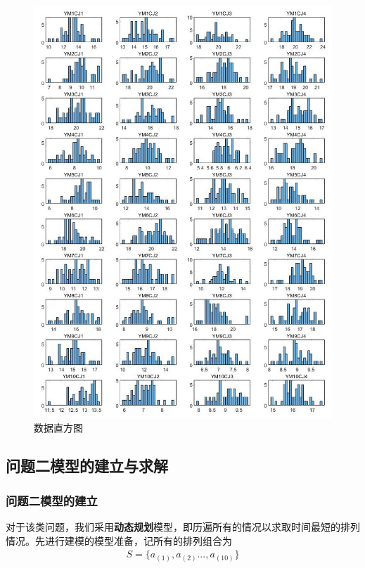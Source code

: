 \documentclass{ctexart}
\begin{document}
\begin{figure}
\centerline{\includegraphics[width=1\linewidth]{A1图片/数据分布直方图.jpg}}
\caption{数据直方图}
\label{数据直方图}
\end{figure}

\newpage
\subsection{问题二模型的建立与求解}
\subsubsection{问题二模型的建立}
对于该类问题，我们采用\textbf{动态规划}模型\cite{ref2}，即历遍所有的情况以求取时间最短的排列情况。先进行建模的模型准备，记所有的排列组合为
\begin{align}
S = \{ a_{(1)} , a_{(2)} ... , a_{(10)} \}\nonumber 
\end{align}
\end{document}
